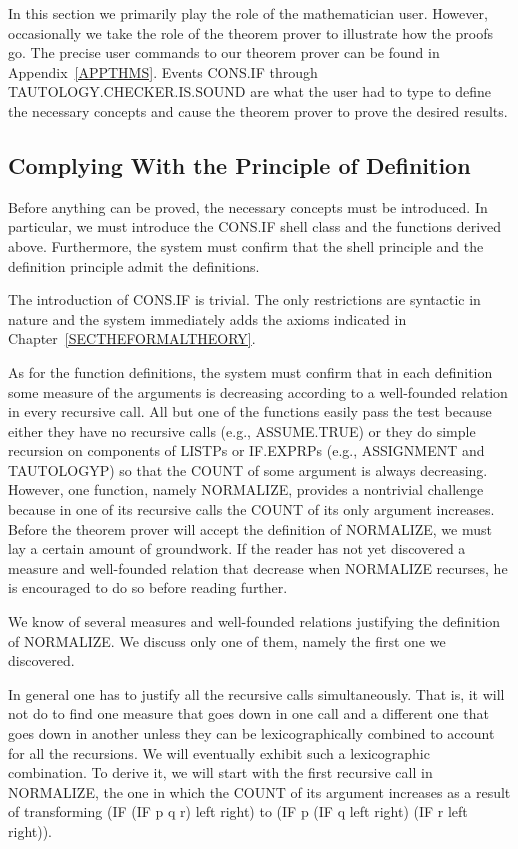 \documentclass[10pt]{book}
\begin{document}
In this section we  primarily play the role of the mathematician user.
However, occasionally we take
the role of the theorem prover to illustrate how the proofs
go.  The precise user commands to
our theorem prover can be found in Appendix~\ref{APPTHMS}.  Events CONS.IF through
TAUTOLOGY.CHECKER.IS.SOUND are what the user had to type
to define the necessary concepts and cause the theorem prover to prove the desired results.

\subsection{Complying With the Principle of Definition}
Before anything can be proved, the necessary concepts must be introduced.  In particular, we
must introduce the CONS.IF shell class and the functions derived above.
Furthermore, the system must confirm that the shell principle and
the definition principle admit the definitions.

The introduction of CONS.IF is trivial.  The only restrictions are syntactic
in nature and the system immediately adds the axioms indicated in
Chapter~\ref{SECTHEFORMALTHEORY}.

As for the function definitions, the system must confirm that in each definition some
measure of the arguments is decreasing according to a well-founded
relation in every recursive call.
All but one of the functions
easily pass the test because either they have no
recursive calls (e.g., ASSUME.TRUE) or they do simple recursion on components of LISTPs or IF.EXPRPs
(e.g., ASSIGNMENT and TAUTOLOGYP) so that the COUNT of some
argument is always decreasing.
However, one function, namely NORMALIZE, provides a nontrivial challenge
because in one of its recursive calls the COUNT of its only argument
increases.  Before the theorem prover will accept the
definition of NORMALIZE, we must lay a certain amount
of groundwork.
If the reader has not yet discovered a measure and  well-founded relation
that decrease when NORMALIZE recurses, he is encouraged to do so before
reading further.

We know of several measures and well-founded relations justifying the definition of
NORMALIZE.  We discuss only one of them, namely the first one we
discovered.

In general one has to justify all the recursive calls simultaneously.
That is, it will not do to find one measure
that goes down in one call and a different one that goes down in another
unless they can be lexicographically combined to account for all the
recursions.  We will eventually exhibit such a lexicographic combination.
To derive it, we will start with the first recursive call in NORMALIZE, the
one in which the COUNT of its argument increases as a result of
transforming (IF (IF p q r) left right) to (IF p (IF q left right) (IF r left right)).
\end{document}
